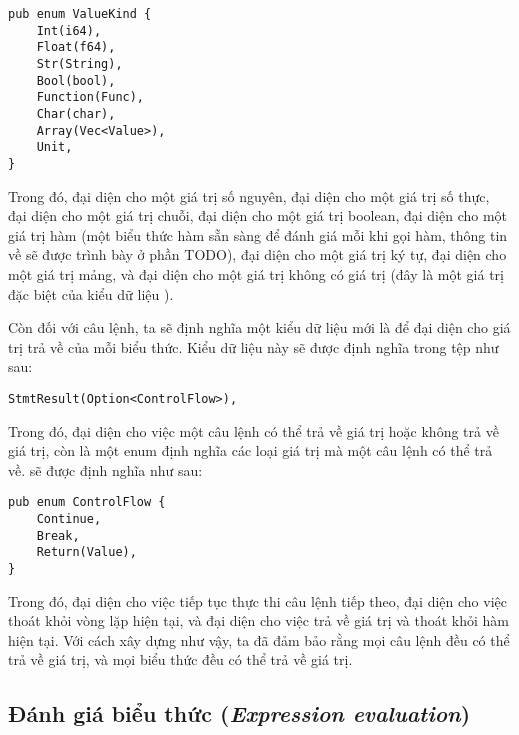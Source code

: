 \begin{lstlisting}[]
pub enum ValueKind {
    Int(i64),
    Float(f64),
    Str(String),
    Bool(bool),
    Function(Func),
    Char(char),
    Array(Vec<Value>),
    Unit,
}
\end{lstlisting}

    Trong đó,  đại diện cho một giá trị số nguyên,  đại diện cho một giá trị số thực,  đại diện cho một giá trị chuỗi,  đại diện cho một giá trị boolean,  đại diện cho một giá trị hàm (một biểu thức hàm sẵn sàng để đánh giá mỗi khi gọi hàm, thông tin về  sẽ được trình bày ở phần TODO),  đại diện cho một giá trị ký tự,  đại diện cho một giá trị mảng, và  đại diện cho một giá trị không có giá trị (đây là một giá trị đặc biệt của kiểu dữ liệu ). 

    
    Còn đối với câu lệnh, ta sẽ định nghĩa một kiểu dữ liệu mới là  để đại diện cho giá trị trả về của mỗi biểu thức. Kiểu dữ liệu này sẽ được định nghĩa trong tệp  như sau:

\begin{lstlisting}[]
StmtResult(Option<ControlFlow>),
\end{lstlisting}

    Trong đó,  đại diện cho việc một câu lệnh có thể trả về giá trị hoặc không trả về giá trị, còn  là một enum định nghĩa các loại giá trị mà một câu lệnh có thể trả về.  sẽ được định nghĩa như sau:

\begin{lstlisting}[]
pub enum ControlFlow {
    Continue,
    Break,
    Return(Value),
}
\end{lstlisting}

    Trong đó,  đại diện cho việc tiếp tục thực thi câu lệnh tiếp theo,  đại diện cho việc thoát khỏi vòng lặp hiện tại, và  đại diện cho việc trả về giá trị  và thoát khỏi hàm hiện tại. Với cách xây dựng như vậy, ta đã đảm bảo rằng mọi câu lệnh đều có thể trả về giá trị, và mọi biểu thức đều có thể trả về giá trị.

\subsection{Đánh giá biểu thức (\textit{Expression evaluation})}

